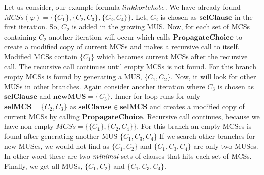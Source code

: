 \begin{example}
	Let us consider, our example formula $link korte hobe$. We have already found $MCSs(\varphi)=\{\{C_{1}\}, \{C_{2}, C_{3}\}, \{C_{2}, C_{4}\}\}$. Let, $C_{2}$ is chosen as $\mathbf{selClause}$ in the first iteration. So, $C_{2}$ is added in the growing MUS. Now, for each set of MCSs containing $C_{2}$ another iteration will occur which calls $\mathbf{PropagateChoice}$ to create a modified copy of current MCSs and makes a recursive call to itself. Modified MCSs contain $\{C_{1}\}$ which becomes current MCSs after the recursive call. The recursive call continues until empty MCSs is not found. For this branch empty MCSs is found by generating a MUS, $\{C_{1}, C_{2}\}$. Now, it will look for other MUSs in other branches.\newline
	Again consider another iteration where $C_{3}$ is chosen as $\mathbf{selClause}$ and $\mathbf{newMUS}=\{C_{3}\}$. Inner for loop runs for only $\mathbf{selMCS}=\{C_{2}, C_{3}\}$ as $\mathbf{selClause}\in \mathbf{selMCS}$ and creates a modified copy of current MCSs by calling $\mathbf{PropagateChoice}$. Recursive call continues, because we have non-empty $MCSs=\{\{C_{1}\}, \{C_{2}, C_{4}\}\}$. For this branch an empty MCSes is found after generating another MUS $\{C_{1}, C_{3}, C_{4}\}$
		If we search other branches for new MUSes, we would not find as $\{C_{1}, C_{2}\}$ and $\{C_{1}, C_{3}, C_{4}\}$ are only two MUSes. In other word these are two $\emph{minimal}$ sets of clauses that hits each set of MCSs.
		Finally, we get all MUSs, $\{C_{1}, C_{2}\}$ and $\{C_{1},C_{3}, C_{4}\}$.
\end{example}